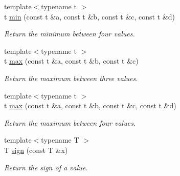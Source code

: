 \begin{DoxyCompactItemize}
{\footnotesize template$<$typename t $>$ }\\t \hyperlink{namespacecimg__library__suffixed_1_1cimg_ad5459593e7f8a4066cb22ad63de8e92d}{min} (const t \&a, const t \&b, const t \&c, const t \&d)
\begin{DoxyCompactList}\small\item\em Return the minimum between four values. \end{DoxyCompactList}\item 
\mbox{\label{namespacecimg__library__suffixed_1_1cimg_aae5df5731fe5a367cec402071108c11c}} 
{\footnotesize template$<$typename t $>$ }\\t \hyperlink{namespacecimg__library__suffixed_1_1cimg_aae5df5731fe5a367cec402071108c11c}{max} (const t \&a, const t \&b, const t \&c)
\begin{DoxyCompactList}\small\item\em Return the maximum between three values. \end{DoxyCompactList}\item 
\mbox{\label{namespacecimg__library__suffixed_1_1cimg_a4b4cabc621d732787bca13016ea8026a}} 
{\footnotesize template$<$typename t $>$ }\\t \hyperlink{namespacecimg__library__suffixed_1_1cimg_a4b4cabc621d732787bca13016ea8026a}{max} (const t \&a, const t \&b, const t \&c, const t \&d)
\begin{DoxyCompactList}\small\item\em Return the maximum between four values. \end{DoxyCompactList}\item 
\mbox{\label{namespacecimg__library__suffixed_1_1cimg_abecddd9720e89882ff3d10dd35f940d9}} 
{\footnotesize template$<$typename T $>$ }\\T \hyperlink{namespacecimg__library__suffixed_1_1cimg_abecddd9720e89882ff3d10dd35f940d9}{sign} (const T \&x)
\begin{DoxyCompactList}\small\item\em Return the sign of a value. \end{DoxyCompactList}\item 
\mbox{\label{namespacecimg__library__suffixed_1_1cimg_a809b0aa9af68d48f9c6c3f61e3555674}} 

\end{DoxyCompactItemize}
